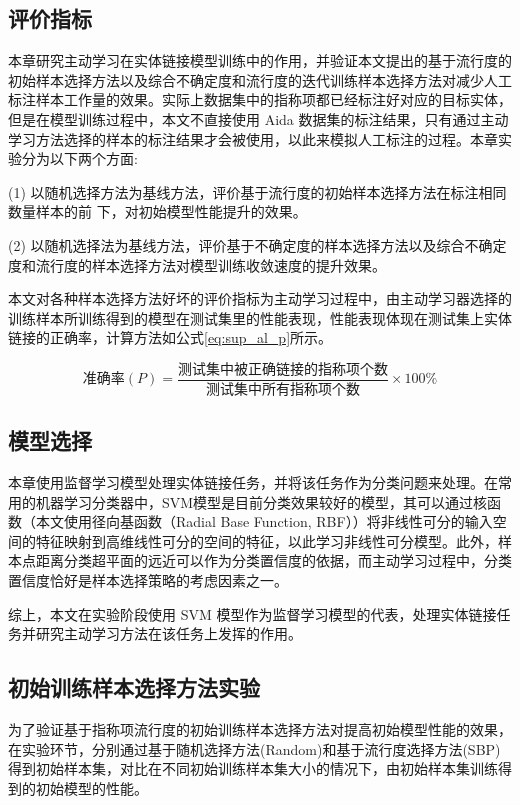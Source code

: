 \subsection{评价指标}
本章研究主动学习在实体链接模型训练中的作用，并验证本文提出的基于流行度的初始样本选择方法以及综合不确定度和流行度的迭代训练样本选择方法对减少人工标注样本工作量的效果。实际上数据集中的指称项都已经标注好对应的目标实体，但是在模型训练过程中，本文不直接使用 Aida 数据集的标注结果，只有通过主动学习方法选择的样本的标注结果才会被使用，以此来模拟人工标注的过程。本章实验分为以下两个方面:

(1) 以随机选择方法为基线方法，评价基于流行度的初始样本选择方法在标注相同数量样本的前 下，对初始模型性能提升的效果。

(2) 以随机选择法为基线方法，评价基于不确定度的样本选择方法以及综合不确定度和流行度的样本选择方法对模型训练收敛速度的提升效果。

本文对各种样本选择方法好坏的评价指标为主动学习过程中，由主动学习器选择的训练样本所训练得到的模型在测试集里的性能表现，性能表现体现在测试集上实体链接的正确率，计算方法如公式\ref{eq:sup_al_p}所示。

\begin{equation}\label{eq:sup_al_p}
\text{准确率}(P)=\frac{\text{测试集中被正确链接的指称项个数}}{\text{测试集中所有指称项个数}}\times 100\%
\end{equation}

\subsection{模型选择}
本章使用监督学习模型处理实体链接任务，并将该任务作为分类问题来处理。在常用的机器学习分类器中，SVM模型\cite{li2016linking}是目前分类效果较好的模型，其可以通过核函数（本文使用径向基函数（Radial Base Function, RBF））将非线性可分的输入空间的特征映射到高维线性可分的空间的特征，以此学习非线性可分模型。此外，样本点距离分类超平面的远近可以作为分类置信度的依据，而主动学习过程中，分类置信度恰好是样本选择策略的考虑因素之一。

综上，本文在实验阶段使用 SVM 模型作为监督学习模型的代表，处理实体链接任务并研究主动学习方法在该任务上发挥的作用。

\subsection{初始训练样本选择方法实验}
为了验证基于指称项流行度的初始训练样本选择方法对提高初始模型性能的效果，在实验环节，分别通过基于随机选择方法(Random)和基于流行度选择方法(SBP)得到初始样本集，对比在不同初始训练样本集大小的情况下，由初始样本集训练得到的初始模型的性能。

